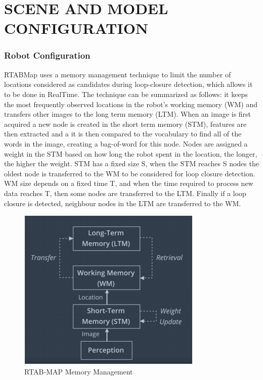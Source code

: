\documentclass[10pt,journal,compsoc]{IEEEtran}
\begin{document}
\section{SCENE AND MODEL CONFIGURATION}
\subsubsection{Robot Configuration}
RTABMap uses a memory management technique to limit
the number of locations considered as candidates during
loop-closure detection, which allows it to be done in RealTime. The technique can be summarized as follows: it
keeps the most frequently observed locations in the robot’s
working memory (WM) and transfers other images to the
long term memory (LTM). When an image is first acquired
a new node is created in the short term memory (STM),
features are then extracted and a it is then compared to the
vocabulary to find all of the words in the image, creating
a bag-of-word for this node. Nodes are assigned a weight
in the STM based on how long the robot spent in the location, the longer, the higher the weight. STM has a fixed
size S, when the STM reaches S nodes the oldest node is
transferred to the WM to be considered for loop closure
detection. WM size depends on a fixed time T, and when
the time required to process new data reaches T, then some
nodes are transferred to the LTM. Finally if a loop closure is
detected, neighbour nodes in the LTM are transferred to the
WM.
\begin{figure}[thpb]
      \centering
      \includegraphics[width=\linewidth]{memory_management}
      \caption{ RTAB-MAP Memory Management}
      \label{fig:rtab_mem_mgmt}
\end{figure}
\end{document}
